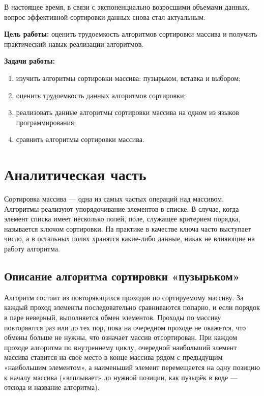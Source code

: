 \documentclass[12pt]{report}
\begin{document}
В настоящее время, в связи с экспоненциально возросшими объемами данных, вопрос эффективной сортировки данных снова стал актуальным.\vspace{\baselineskip} 


\textbf{Цель работы:} оценить трудоемкость алгоритмов сортировки массива и получить практический навык реализации алгоритмов.\vspace{\baselineskip} 

\textbf{Задачи работы:}
\begin{enumerate}
  	\item изучить алгоритмы сортировки массива: пузырьком, вставка и выбором; 
  	\item оценить трудоемкость данных алгоритмов сортировки;
  	\item реализовать данные алгоритмы сортировки массива на одном из языков программирования;  
  	\item сравнить алгоритмы сортировки массива.
\end{enumerate}


\chapter{Аналитическая часть}

Сортировка массива — одна из самых частых операций над массивом. Алгоритмы реализуют упорядочивание элементов в списке. В случае, когда элемент списка имеет несколько полей, поле, служащее критерием порядка, называется ключом сортировки. На практике в качестве ключа
часто выступает число, а в остальных полях хранятся какие-либо данные,
никак не влияющие на работу алгоритма.


\section{Описание алгоритма сортировки «пузырьком»}
Алгоритм состоит из повторяющихся проходов по сортируемому массиву.
За каждый проход элементы последовательно сравниваются попарно, и если
порядок в паре неверный, выполняется обмен элементов. Проходы по массиву
повторяются раз или до тех пор, пока на очередном проходе не окажется,
что обмены больше не нужны, что означает массив отсортирован. При каждом
проходе алгоритма по внутреннему циклу, очередной наибольший элемент
массива ставится на своё место в конце массива рядом с предыдущим
«наибольшим элементом», а наименьший элемент перемещается на одну
позицию к началу массива («всплывает» до нужной позиции, как пузырёк в
воде — отсюда и название алгоритма). 
\end{document}
